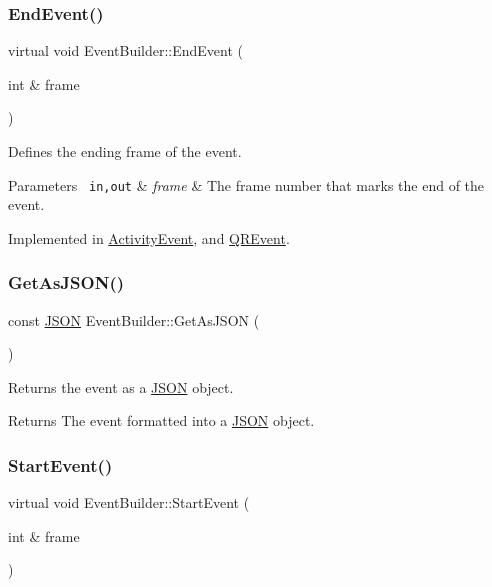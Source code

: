\subsubsection{\texorpdfstring{EndEvent()}{EndEvent()}}
{\footnotesize\ttfamily virtual void Event\+Builder\+::\+End\+Event (\begin{DoxyParamCaption}\item[{int \&}]{frame }\end{DoxyParamCaption})\hspace{0.3cm}{\ttfamily [pure virtual]}}

Defines the ending frame of the event. 
\begin{DoxyParams}[1]{Parameters}
\mbox{\texttt{ in,out}}  & {\em frame} & The frame number that marks the end of the event. \\
\hline
\end{DoxyParams}


Implemented in \mbox{\hyperlink{class_activity_event_a803c52c6e131e3da665a67424b6acd2d}{Activity\+Event}}, and \mbox{\hyperlink{class_q_r_event_adb8483f8513c1f3a5021eef1bd55f8c9}{Q\+R\+Event}}.

\mbox{\label{class_event_builder_aac866d98d3b7aa7ac4c46d26cf7cf0ff}} 
\subsubsection{\texorpdfstring{GetAsJSON()}{GetAsJSON()}}
{\footnotesize\ttfamily const \mbox{\hyperlink{class_j_s_o_n}{J\+S\+ON}} Event\+Builder\+::\+Get\+As\+J\+S\+ON (\begin{DoxyParamCaption}{ }\end{DoxyParamCaption})}

Returns the event as a \mbox{\hyperlink{class_j_s_o_n}{J\+S\+ON}} object. \begin{DoxyReturn}{Returns}
The event formatted into a \mbox{\hyperlink{class_j_s_o_n}{J\+S\+ON}} object. 
\end{DoxyReturn}
\mbox{\label{class_event_builder_a62435c441382ebf14191b5b0c17904e3}} 
\subsubsection{\texorpdfstring{StartEvent()}{StartEvent()}}
{\footnotesize\ttfamily virtual void Event\+Builder\+::\+Start\+Event (\begin{DoxyParamCaption}\item[{int \&}]{frame }\end{DoxyParamCaption})\hspace{0.3cm}{\ttfamily [pure virtual]}}

